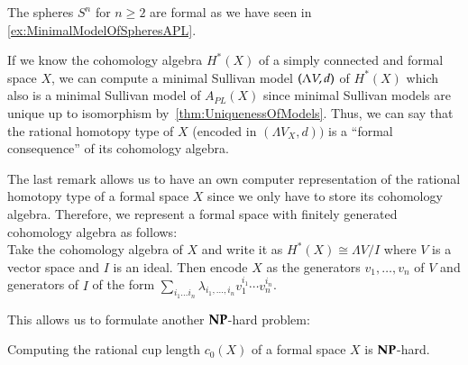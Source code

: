 \begin{Example}
 The spheres $S^n$ for $n \geq 2$ are formal as we have seen in \ref{ex:MinimalModelOfSpheresAPL}. 
\end{Example}


\begin{Remark}
 If we know the cohomology algebra $H^*(X)$ of a simply connected and formal space $X$, we can compute a minimal Sullivan model
 $(\Lambda V,d)$ of $H^*(X)$ which also is a minimal Sullivan model of $A_{PL}(X)$ since 
 minimal Sullivan models are unique up to isomorphism by~\ref{thm:UniquenessOfModels}. Thus, we can say
 that the rational homotopy type of $X$ (encoded in $(\Lambda V_X,d))$ is a ``formal consequence'' of its 
 cohomology algebra.
\end{Remark}

\begin{Remark}
 \label{rem:EncodingOfFormalSpaces}
 The last remark allows us to have an own computer representation of the rational homotopy type of 
 a formal space $X$ since we only have to store its cohomology algebra. Therefore, we represent a 
 formal space with finitely generated cohomology algebra as follows: \\
 Take the cohomology algebra of $X$ and write it as $H^*(X) \cong \Lambda V / I$ where $V$ is a vector
 space and $I$ is an ideal. Then encode $X$ as the generators $v_1, \ldots, v_n$ of $V$ and generators 
 of $I$ of the form $\sum_{i_1 \ldots i_n} \lambda_{i_1, \ldots , i_n} v_1^{i_1} \cdots v_n^{i_n}$.
\end{Remark}


This allows us to formulate another $\mathbf{NP}$-hard problem:

\begin{Theorem}
\label{thm:RationalCupLengthOfFormalSpacesIsNPHard}
 Computing the rational cup length $c_0 (X)$ of a formal space $X$ is $\mathbf{NP}$-hard.
\end{Theorem}


